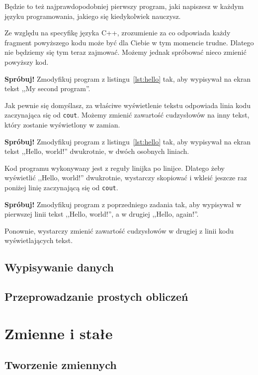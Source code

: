 \documentclass[11pt]{book}
\newenvironment{try}
{ \vspace{1em} \noindent
  \definecolor{shadecolor}{gray}{0.7}
  \begin{minipage}{\textwidth} 
  \begin{shaded} 
  \textbf{Spróbuj!} }
{ \end{shaded} 
  \end{minipage} 
  \vspace{1em} }
\begin{document}
Będzie to też najprawdopodobniej pierwszy program, jaki napiszesz w każdym 
języku programowania, jakiego się kiedykolwiek nauczysz. 

Ze względu na specyfikę języka C++, zrozumienie za co odpowiada każdy fragment 
powyższego kodu może być dla Ciebie w tym momencie trudne. Dlatego nie będziemy
się tym teraz zajmować. Możemy jednak spróbować nieco zmienić powyższy kod.

\begin{try}
Zmodyfikuj program z listingu~\ref{lst:hello} tak, aby wypisywał na ekran tekst 
,,My second program''.
\end{try}

Jak pewnie się domyślasz, za właściwe wyświetlenie tekstu odpowiada linia
kodu zaczynająca się od \texttt{cout}. Możemy zmienić zawartość cudzysłowów
na inny tekst, który zostanie wyświetlony w zamian.

\begin{try}
Zmodyfikuj program z listingu~\ref{lst:hello} tak, aby wypisywał na ekran tekst
,,Hello, world!'' dwukrotnie, w dwóch osobnych liniach.
\end{try}

Kod programu wykonywany jest z reguły linijka po linijce. Dlatego żeby
wyświetlić ,,Hello, world!'' dwukrotnie, wystarczy skopiować i wkleić jeszcze
raz poniżej linię zaczynającą się od \texttt{cout}.

\begin{try}
Zmodyfikuj program z poprzedniego zadania tak, aby wypisywał w pierwszej linii
tekst ,,Hello, world!'', a w drugiej ,,Hello, again!''.
\end{try}

Ponownie, wystarczy zmienić zawartość cudzysłowów w drugiej z linii kodu
wyświetlających tekst.

\section{Wypisywanie danych}
\section{Przeprowadzanie prostych obliczeń}

\chapter{Zmienne i stałe}
\section{Tworzenie zmiennych}
\end{document}
